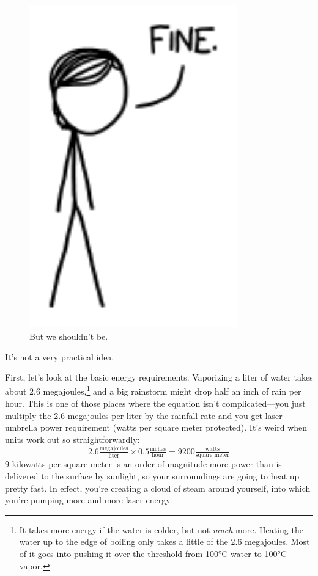 {\begin{figure}[!htbp]
\centering
\includegraphics[scale=0.5, max width=0.8\textwidth]{imgs/a/119/ok.png}
\caption{But we shouldn't be.}
\end{figure}

{It's not a very practical idea.}

{First, let's look at the basic energy requirements. Vaporizing a liter of water takes about 2.6 megajoules,{\footnote{It takes more energy if the water is colder, but not \emph{much} more. Heating the water up to the edge of boiling only takes a little of the 2.6 megajoules. Most of it goes into pushing it over the threshold from 100°C water to 100°C vapor.} } and a big rainstorm might drop half an inch of rain per hour. This is one of those places where the equation isn't complicated—you just \href{http://www.wolframalpha.com/input/?i=2.6+megajoules\%2Fliter+*+1+cm\%2Fhour}{multiply} the 2.6 megajoules per liter by the rainfall rate and you get laser umbrella power requirement (watts per square meter protected). It's weird when units work out so straightforwardly:\[2.6\tfrac{\text{megajoules}}{\text{liter}}\times0.5\tfrac{\text{inches}}{\text{hour}}=9200\tfrac{\text{watts}}{\text{square meter}}\] 9 kilowatts per square meter is an order of magnitude more power than is delivered to the surface by sunlight, so your surroundings are going to heat up pretty fast. In effect, you're creating a cloud of steam around yourself, into which you're pumping more and more laser energy.}

}
